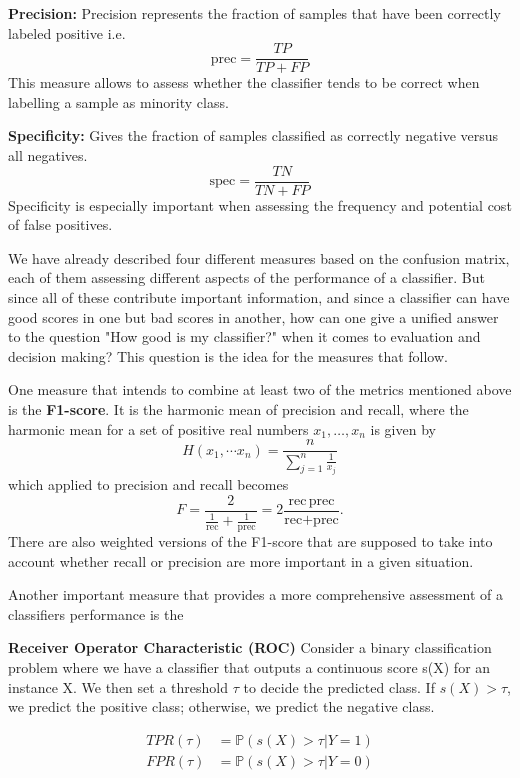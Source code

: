 \textbf{Precision:}
Precision represents the fraction of samples that have been correctly labeled positive i.e.
\[
	\text{prec} = \frac{TP}{TP + FP}
\]
This measure allows to assess whether the classifier tends to be correct when labelling a sample as minority class.

\textbf{Specificity:}
Gives the fraction of samples classified as correctly negative versus all negatives.
\[
	\text{spec} = \frac{TN}{TN + FP}
\]
Specificity is especially important when assessing the frequency and potential cost of false positives.

We have already described four different measures based on the confusion matrix, each of them assessing different aspects of the performance of a classifier.
But since all of these contribute important information, and since a classifier can have good scores in one but bad scores in another, 
how can one give a unified answer to the question "How good is my classifier?" when it comes to evaluation and decision making?
This question is the idea for the measures that follow.

One measure that intends to combine at least two of the metrics mentioned above is the \textbf{F1-score}.
It is the harmonic mean of precision and recall, where the harmonic mean for a set of positive real numbers $x_1, \dots, x_n$ is given by
\[
	H(x_1, \dotsm x_n) = \frac{n}{\sum_{j=1}^n \frac{1}{x_j}}
\]
which applied to precision and recall becomes
\[
	F = \frac{2}{ \frac{1}{\text{rec}} + \frac{1}{\text{prec}} } = 2 \frac{\text{rec} \, \text{prec}}{ \text{rec} + \text{prec} }.
\]
There are also weighted versions of the F1-score that are supposed to take into account whether recall or precision are more important in a given situation.


Another important measure that provides a more comprehensive assessment of a classifiers performance is the

\textbf{Receiver Operator Characteristic (ROC)}
Consider a binary classification problem where we have a classifier that outputs a continuous score s(X) for an instance X.
We then set a threshold $\tau$ to decide the predicted class. If $s(X) > \tau$, we predict the positive class; otherwise, we predict the negative class.

    	\begin{align*}
    		TPR(\tau) &= \mathbb{P}(s(X) > \tau | Y = 1) \\
    		FPR(\tau) &= \mathbb{P}(s(X) > \tau | Y = 0)
    	\end{align*}

